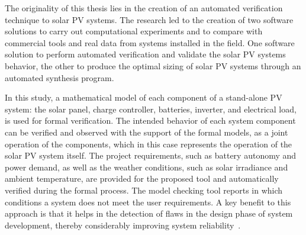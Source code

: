 The originality of this thesis lies in the creation of an automated verification technique to solar PV systems. The research led to the creation of two software solutions to carry out computational experiments and to compare with commercial tools and real data from systems installed in the field. One software solution to perform automated verification and validate the solar PV systems behavior, the other to produce the optimal sizing of solar PV systems through an automated synthesis program.

In this study, a mathematical model of each component of a stand-alone PV system: the solar panel, charge controller, batteries, inverter, and electrical load, is used for formal verification. The intended behavior of each system component can be verified and observed with the support of the formal models, as a joint operation of the components, which in this case represents the operation of the solar PV system itself. The project requirements, such as battery autonomy and power demand, as well as the weather conditions, such as solar irradiance and ambient temperature, are provided for the proposed tool and automatically verified during the formal process. The model checking tool reports in which conditions a system does not meet the user requirements. A key benefit to this approach is that it helps in the detection of flaws in the design phase of system development, thereby considerably improving system reliability~\cite{Akram2018}. 

